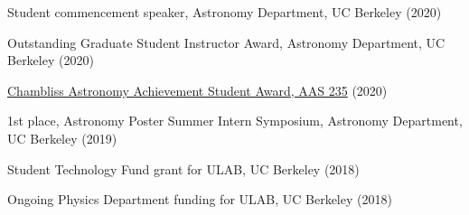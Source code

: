 \item[{\color{numcolor}\scriptsize6}] Student commencement speaker, Astronomy Department, UC Berkeley (2020)

\item[{\color{numcolor}\scriptsize5}] Outstanding Graduate Student Instructor Award, Astronomy Department, UC Berkeley (2020)

\item[{\color{numcolor}\scriptsize4}] \href{https://aas.org/grants-and-prizes/chambliss-astronomy-achievement-student-awards}{Chambliss Astronomy Achievement Student Award, AAS 235} (2020)

\item[{\color{numcolor}\scriptsize3}] 1st place, Astronomy Poster Summer Intern Symposium, Astronomy Department, UC Berkeley (2019)

\item[{\color{numcolor}\scriptsize2}] Student Technology Fund grant for ULAB, UC Berkeley (2018)

\item[{\color{numcolor}\scriptsize1}] Ongoing Physics Department funding for ULAB, UC Berkeley (2018)